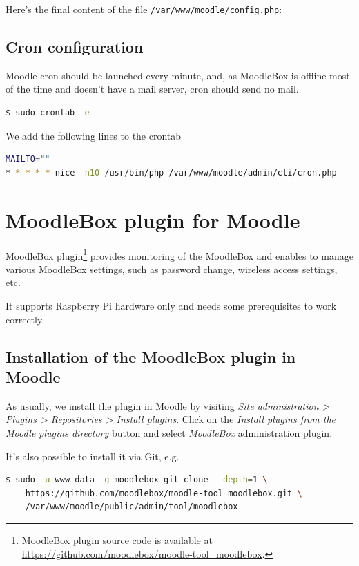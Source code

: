 \documentclass[12pt]{article}
\begin{document}
Here's the final content of the file \lstinline{/var/www/moodle/config.php}:


\subsection{Cron configuration}

Moodle cron should be launched every minute, and, as MoodleBox is offline most of the time and doesn't have a mail server, cron should send no mail.
\begin{lstlisting}[language=bash]
$ sudo crontab -e
\end{lstlisting}
We add the following lines to the crontab
\begin{lstlisting}[language=bash]
MAILTO=""
* * * * * nice -n10 /usr/bin/php /var/www/moodle/admin/cli/cron.php
\end{lstlisting}

\section{MoodleBox plugin for Moodle}

MoodleBox plugin\footnote{MoodleBox plugin source code is available at \url{https://github.com/moodlebox/moodle-tool_moodlebox}.} provides monitoring of the MoodleBox and enables to manage various MoodleBox settings, such as password change, wireless access settings, etc.

It supports Raspberry Pi hardware only and needs some prerequisites to work correctly.

\subsection{Installation of the MoodleBox plugin in Moodle}

As usually, we install the plugin in Moodle by visiting \emph{Site administration > Plugins > Repositories > Install plugins}.
Click on the \emph{Install plugins from the Moodle plugins directory} button and select \emph{MoodleBox} administration plugin.

It's also possible to install it via Git, e.g.

\begin{lstlisting}[language=bash]
$ sudo -u www-data -g moodlebox git clone --depth=1 \
    https://github.com/moodlebox/moodle-tool_moodlebox.git \
    /var/www/moodle/public/admin/tool/moodlebox
\end{lstlisting}
\end{document}
